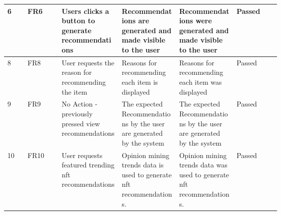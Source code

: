 \begin{longtable}{|l|l|p{0.22\linewidth}|p{0.21\linewidth}|p{0.21\linewidth}|l|}
\hline
6 & FR6 & Users clicks a button to generate recommendations & Recommendations are generated and made visible to the user & Recommendations were generated and made visible to the user & Passed \\
\hline
8 & FR8 & User requests the reason for recommending the item & Reasons for recommending each item is displayed & Reasons for recommending each item was displayed & Passed \\
\hline
9 & FR9 & No Action - previously pressed view recommendations & The expected Recommendations by the user are generated by the system & The expected Recommendations by the user are generated by the system & Passed \\
\hline
10 & FR10 & User requests featured trending \gls{nft} recommendations & Opinion mining trends data is used to generate \gls{nft} recommendations. & Opinion mining trends data was used to generate \gls{nft} recommendations. & Passed \\
\hline
\end{longtable}

